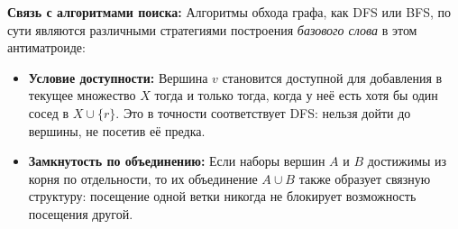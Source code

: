 \textbf{Связь с алгоритмами поиска:}
Алгоритмы обхода графа, как DFS или BFS, по сути являются различными стратегиями построения \textit{базового слова} в этом антиматроиде:
\begin{itemize}
    \item \textbf{Условие доступности:} Вершина $v$ становится доступной для добавления в текущее множество $X$ тогда и только тогда, когда у неё есть хотя бы один сосед в $X \cup \{r\}$. Это в точности соответствует DFS: нельзя дойти до вершины, не посетив её предка.
    \item \textbf{Замкнутость по объединению:} Если наборы вершин $A$ и $B$ достижимы из корня по отдельности, то их объединение $A \cup B$ также образует связную структуру: посещение одной ветки никогда не блокирует возможность посещения другой.
\end{itemize}

